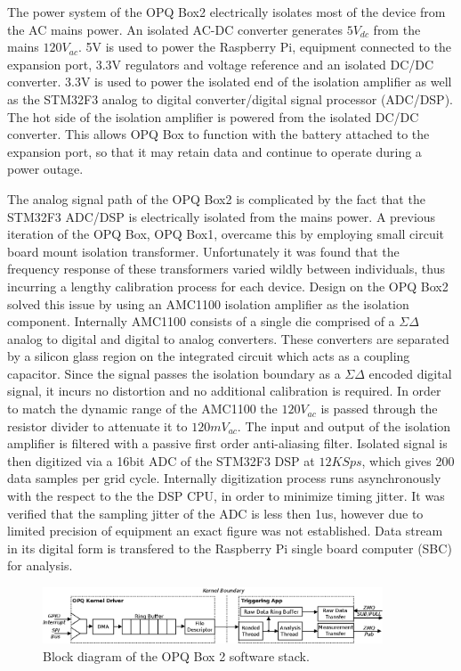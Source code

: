 The power system of the OPQ Box2 electrically isolates most of the device from the AC mains power.
An isolated AC-DC converter generates $5V_{dc}$ from the mains $120V_{ac}$.
5V is used to power the Raspberry Pi, equipment connected to the expansion port, 3.3V regulators and voltage reference and an isolated DC/DC converter.
3.3V is used to power the isolated end of the isolation amplifier as well as the STM32F3 analog to digital converter/digital signal processor (ADC/DSP).
The hot side of the isolation amplifier is powered from the isolated DC/DC converter.
This allows OPQ Box to function with the battery attached to the expansion port, so that it may retain data and continue to operate during a power outage.


The analog signal path of the OPQ Box2 is complicated by the fact that the STM32F3 ADC/DSP is electrically isolated from the mains power.
A previous iteration of the OPQ Box, OPQ Box1, overcame this by employing small circuit board mount isolation transformer.
Unfortunately it was found that the frequency response of these transformers varied wildly between individuals, thus incurring a lengthy calibration process for each device.
Design on the OPQ Box2 solved this issue by using an AMC1100 isolation amplifier as the isolation component.
Internally AMC1100 consists of a single die comprised of a $\Sigma\Delta$ analog to digital and digital to analog converters.
These converters are separated by a silicon glass region on the integrated circuit which acts as a coupling capacitor.
Since the signal passes the isolation boundary as a $\Sigma\Delta$ encoded digital signal, it incurs no distortion and no additional calibration is required.
In order to match the dynamic range of the AMC1100 the $120V_{ac}$ is passed through the resistor divider to attenuate it to $120mV_{ac}$.
The input and output of the isolation amplifier is filtered with a passive first order anti-aliasing filter.
Isolated signal is then digitized via a 16bit ADC of the STM32F3 DSP at $12 KSps$, which gives 200 data samples per grid cycle.
Internally digitization process runs asynchronously with the respect to the the DSP CPU, in order to minimize timing jitter.
It was verified that the sampling jitter of the ADC is less then 1us, however due to limited precision of equipment an exact figure was not established.
Data stream in its digital form is transfered to the Raspberry Pi single board computer (SBC) for analysis.

\begin{figure}[h]
  \begin{center}
  \includegraphics[width=0.9\textwidth]{img/opqbox_software.png}
  \end{center}
  \caption{Block diagram of the OPQ Box 2 software stack.}
  \label{fig:opq:3}
\end{figure}

